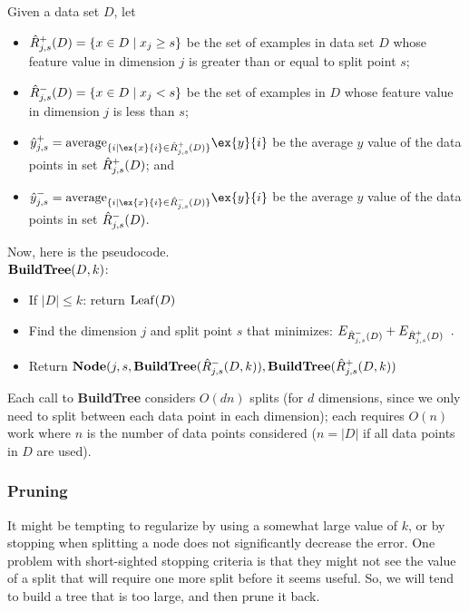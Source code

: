Given a data set $D$, let 
\begin{itemize}
\item $\hat{R}^+_{j,s}(D) = \{x \in D \mid x_j \geq s\}$ be the set of
  examples 
in data set $D$ whose feature value in dimension $j$ is greater
  than or equal to split point $s$;
\item $\hat{R}^-_{j,s}(D) = \{x \in D \mid x_j < s\}$ be the set of examples
  in $D$ whose feature value in dimension $j$ is less than $s$; 
\item $\hat{y}^+_{j,s} = {\rm average}_{\{i \mid \ex{x}{i} \in
    \Rdata^+_{j,s}(D)\}}\ex{y}{i} $ be the average $y$ value of the data
  points in set $\hat{R}^+_{j,s}(D)$; and 
\item $\hat{y}^-_{j,s} = {\rm average}_{\{i \mid \ex{x}{i} \in
    \Rdata^-_{j,s}(D)\}}\ex{y}{i} $ be the average $y$ value of the data
  points in set $\hat{R}^-_{j,s}(D)$.
\end{itemize}
Now, here is the pseudocode. \\

\noindent ${\bf BuildTree}(D,k)$:
\begin{itemize}
\item If $|D| \leq k$: return ${\rm Leaf}(D)$
\item Find the dimension $j$ and split point $s$ that minimizes:
      $E_{\hat{R}^-_{j,s}(D)} + E_{\hat{R}^+_{j,s}(D)}\;\;.$
\item Return ${\bf Node}(j, s, {\bf BuildTree}(\hat{R}^-_{j,s}(D,k)), {\bf BuildTree}(\hat{R}^+_{j,s}(D,k))$
\end{itemize}

Each call to {\bf BuildTree} considers $O(d n)$ splits (for $d$ dimensions, since we only need to
split between each data point in each dimension); each requires
$O(n)$ work where $n$ is the number of data points considered ($n = |D|$
if all data points in $D$ are used).

\subsubsection{Pruning}
It might be tempting to regularize by using a somewhat large
value of $k$, or by stopping when splitting a node does not significantly
decrease the error.  One problem with short-sighted stopping criteria
is that they might not see the value of a split that will require one
more split before it seems useful.
So, we will tend to build a tree that is too large, and then prune it
back. 

